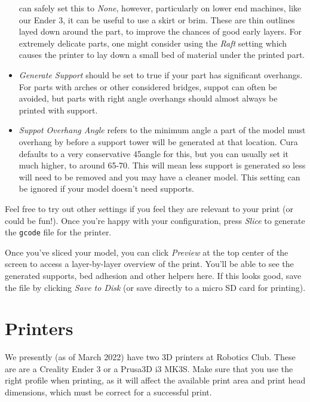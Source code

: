 \documentclass[12pt]{report}
\begin{document}
\begin{itemize}
        can safely set this to \textit{None}, however, particularly on lower end
        machines, like our Ender 3, it can be useful to use a skirt or brim.
        These are thin outlines layed down around the part, to improve the
        chances of good early layers. For extremely delicate parts, one might
        consider using the \textit{Raft} setting which causes the printer to lay
        down a small bed of material under the printed part.
    \item \textit{Generate Support} should be set to true if your part has
        significant overhangs. For parts with arches or other considered
        bridges, suppot can often be avoided, but parts with right angle
        overhangs should almost always be printed with support.
    \item \textit{Suppot Overhang Angle} refers to the minimum angle a part of
        the model must overhang by before a support tower will be generated at
        that location. Cura defaults to a very conservative 45\textdegree angle
        for this, but you can usually set it much higher, to around
        65-70\textdegree. This will mean less support is generated so less will
        need to be removed and you may have a cleaner model. This setting can be
        ignored if your model doesn't need supports.
\end{itemize}

Feel free to try out other settings if you feel they are relevant to your print
(or could be fun!). Once you're happy with your configuration, press
\textit{Slice} to generate the \texttt{gcode} file for the printer. \par
Once you've sliced your model, you can click \textit{Preview} at the top center
of the screen to access a layer-by-layer overview of the print. You'll be able
to see the generated supports, bed adhesion and other helpers here. If this
looks good, save the file by clicking \textit{Save to Disk} (or save directly
to a micro SD card for printing).

\section*{Printers}
\label{sec:printers}

We presently (as of March 2022) have two 3D printers at Robotics Club. These are
are a Creality Ender 3 or a Prusa3D i3 MK3S. Make sure that you use the right
profile when printing, as it will affect the available print area and print head
dimensions, which must be correct for a successful print.
\end{document}
